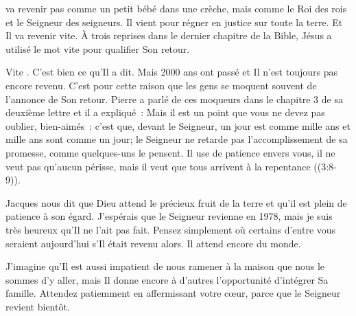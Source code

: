 



 va revenir \ocadr pas comme un petit bébé dans une crèche,
 mais comme le Roi des rois et le Seigneur des seigneurs.
 Il vient pour régner en justice sur toute la terre. Et Il va revenir vite.
 À trois reprises dans le dernier chapitre de la Bible, Jésus a utilisé le mot
 \og vite \fg{} pour qualifier Son retour.

\og Vite \fg{}. C'est bien ce qu'Il a dit.
 Mais 2000 ans ont passé et Il n'est toujours pas encore revenu.
 C'est pour cette raison que les gens se moquent souvent de l'annonce
 de Son retour. Pierre a parlé de ces moqueurs dans le chapitre 3
 de sa deuxième lettre et il a expliqué~:
 \og Mais il est un point que vous ne devez pas oublier, bien-aimés~:
 c'est que, devant le Seigneur, un jour est comme mille ans et mille ans
 sont comme un jour; le Seigneur ne retarde pas l'accomplissement
 de sa promesse, comme quelques-uns le pensent.
 Il use de patience envers vous, il ne veut pas qu'aucun périsse,
 mais il veut que tous arrivent à la repentance \fg{}
 ((3:8-9)).


Jacques nous dit que Dieu attend le précieux fruit de la terre
 et qu'il est plein de patience à son égard.
 J'espérais que le Seigneur revienne en 1978, mais je suis très heureux
 qu'Il ne l'ait pas fait. Pensez simplement où certains d'entre vous seraient
 aujourd'hui s'Il était revenu alors. Il attend encore du monde.

J'imagine qu'Il est aussi impatient de nous ramener à la maison
 que nous le sommes d'y aller, mais Il donne encore à d'autres l'opportunité
 d'intégrer Sa famille. Attendez patiemment en affermissant votre c\oe{}ur,
 parce que le Seigneur revient bientôt.

\dvrule





